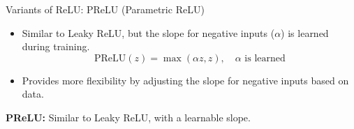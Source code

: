 \documentclass[serif, aspectratio=169]{beamer}
\begin{document}
\begin{frame}{Variants of ReLU: PReLU (Parametric ReLU)}
    \begin{itemize}
        \item Similar to Leaky ReLU, but the slope for negative inputs (\( \alpha \)) is learned during training.
        \begin{equation*}
            \text{PReLU}(z) = \max(\alpha z, z), \quad \alpha \text{ is learned}
        \end{equation*}
        \item Provides more flexibility by adjusting the slope for negative inputs based on data.
    \end{itemize} 
            \begin{center}
            \end{center}
            \centering
            \textbf{PReLU:} Similar to Leaky ReLU, with a learnable slope.
\end{frame}
\end{document}
